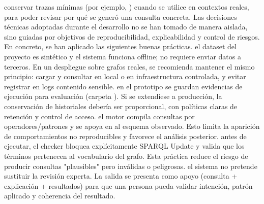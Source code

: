 \markdownRendererUlItem {} conservar trazas mínimas (por ejemplo, ) cuando se utilice en contextos reales, para poder revisar por qué se generó una consulta concreta.\markdownRendererUlItemEnd 
\markdownRendererUlEndTight \markdownRendererInterblockSeparator
{}\markdownRendererInterblockSeparator
{}Las decisiones técnicas adoptadas durante el desarrollo no se han tomado de manera aislada, sino guiadas por objetivos de reproducibilidad, explicabilidad y control de riesgos. En concreto, se han aplicado las siguientes buenas prácticas.\markdownRendererInterblockSeparator
{}\markdownRendererInterblockSeparator
{}\markdownRendererUlBegin
\markdownRendererUlItem {} el dataset del proyecto es sintético y el sistema funciona offline; no requiere enviar datos a terceros. En un despliegue sobre grafos reales, se recomienda mantener el mismo principio: cargar y consultar en local o en infraestructura controlada, y evitar registrar en logs contenido sensible.\markdownRendererUlItemEnd 
\markdownRendererUlItem {} en el prototipo se guardan evidencias de ejecución para evaluación (carpeta ). Si se extendiese a producción, la conservación de historiales debería ser proporcional, con políticas claras de retención y control de acceso.\markdownRendererUlItemEnd 
\markdownRendererUlEnd \markdownRendererInterblockSeparator
{}\markdownRendererInterblockSeparator
{}\markdownRendererUlBegin
\markdownRendererUlItem {} el motor compila consultas por operadores/patrones y se apoya en  al esquema observado. Esto limita la aparición de comportamientos no reproducibles y favorece el análisis posterior.\markdownRendererUlItemEnd 
\markdownRendererUlItem {} antes de ejecutar, el checker bloquea explícitamente SPARQL Update y valida que los términos pertenecen al vocabulario del grafo. Esta práctica reduce el riesgo de producir consultas "plausibles" pero inválidas o peligrosas.\markdownRendererUlItemEnd 
\markdownRendererUlItem {} el sistema no pretende sustituir la revisión experta. La salida se presenta como apoyo (consulta + explicación + resultados) para que una persona pueda validar intención, patrón aplicado y coherencia del resultado.\markdownRendererUlItemEnd 
